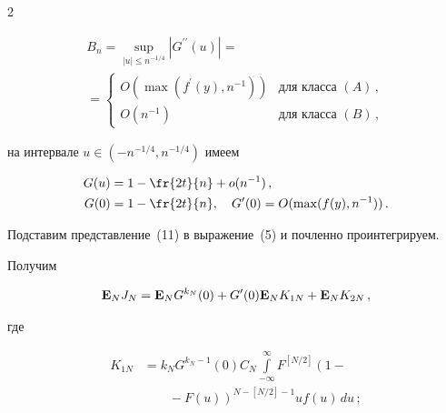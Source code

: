\begin{multicols}{2}
\begin{equation}
\label{12}


\end{equation}


\begin{multline}


B_n=\sup_{|u|\leq n^{-1/4}}|G^{\prime \prime }(u)|={}\\


{}=


\begin{cases} 


O(\max(f^{\prime}(y),n^{-1})) & \mbox{для


класса $(A)$}\,, \\ 


O(n^{-1}) & \mbox {для класса $(B)$}\,, 


\end{cases}


\label{13}


\end{multline} 


на интервале $u\in (-n^{-1/4},n^{-1/4})$ имеем


\begin{align}


G(u)&=1-\fr{2t}{n}+o(n^{-1})\,,\notag\\


G(0)&=1-\fr{2t}{n}, \quad


G^{\prime}(0)=O(\max(f(y),n^{-1}))\,. \label{14}


\end{align}


Подставим представление~(11) в выражение~(5) и почленно проинтегрируем.


Получим 


\begin{equation}


{\bf E}_NJ_N={\bf E}_NG^{k_N}(0)+G^{\prime}(0){\bf E}_N


K_{1N}+{\bf E}_N K_{2N}\,, \label{15}


\end{equation} 


где 


\begin{align*}


K_{1N}&= k_NG^{k_N-1}(0)C_N \int\limits_{-\infty}^{\infty}F^{[N/2]}\left(1-{}\right.\\


&\ \ \ \ \ \ \ \ \ \left.{}-F(u)\right )^{N-[N/2]-1}uf(u)\,du\,;


\\



\end{align*}
\end{multicols}
